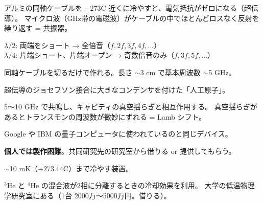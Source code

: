 \documentclass[12pt,a4paper]{article}
\begin{document}
\begin{storybox}[超伝導共振器]
アルミの同軸ケーブルを $-273$\textdegree C 近くに冷やすと、電気抵抗がゼロになる（超伝導）。
マイクロ波（GHz帯の電磁波）がケーブルの中でほとんどロスなく反射を繰り返す = 共振器。

$\lambda/2$: 両端をショート → 全倍音（$f, 2f, 3f, 4f, \ldots$）\\
$\lambda/4$: 片端ショート、片端オープン → 奇数倍音のみ（$f, 3f, 5f, \ldots$）

同軸ケーブルを切るだけで作れる。長さ $\sim$3 cm で基本周波数 $\sim$5 GHz。
\end{storybox}

\begin{storybox}[トランスモン量子ビット]
超伝導のジョセフソン接合に大きなコンデンサを付けた「人工原子」。

5〜10 GHz で共鳴し、キャビティの真空揺らぎと相互作用する。
真空揺らぎがあるとトランスモンの周波数が微妙にずれる = Lamb シフト。

Google や IBM の量子コンピュータに使われているのと同じデバイス。

\textbf{個人では製作困難}。共同研究先の研究室から借りる or 提供してもらう。
\end{storybox}

\begin{storybox}[希釈冷凍機]
$\sim$10 mK（$-273.14$\textdegree C）まで冷やす装置。

$^3$He と $^4$He の混合液が2相に分離するときの冷却効果を利用。
大学の低温物理学研究室にある（1台 2000万〜5000万円。借りる）。
\end{storybox}
\end{document}
